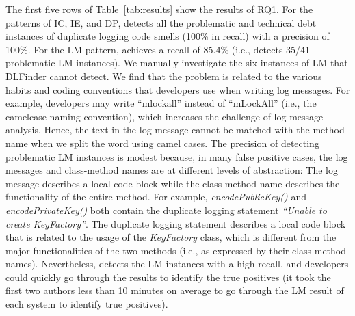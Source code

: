 The first five rows of Table~\ref{tab:results} show the results of RQ1. For the patterns of IC, IE, and DP, \toolS detects all the problematic and technical debt instances of duplicate logging code smells (100\% in recall) with a precision of 100\%. 
For the LM pattern, \toolS achieves a recall of 85.4\% (i.e., \toolS detects 35/41 problematic LM instances). We manually investigate the six instances of LM that DLFinder cannot detect. We find that the problem is related to the various habits and coding conventions that developers use when writing log messages. For example, developers may write ``mlockall'' instead of ``mLockAll'' (i.e., the camelcase naming convention), which increases the challenge of log message analysis. Hence, the text in the log message cannot be matched with the method name when we split the word using camel cases. The precision of detecting problematic LM instances is modest because, in many false positive cases, the log messages and class-method names are at different levels of abstraction: The log message describes a local code block while the class-method name describes the functionality of the entire method.
For example, {\em encodePublicKey()} and {\em encodePrivateKey()} both contain the duplicate logging statement {\em ``Unable to create KeyFactory''}. The duplicate logging statement describes a local code block that is related to the usage of the {\em KeyFactory} class, which is different from the major functionalities of the two methods (i.e., as expressed by their class-method names).
Nevertheless, \toolS detects the LM instances with a high recall, and developers could quickly go through the results to identify the true positives (it took the first two authors less than 10 minutes on average to go through the LM result of each system to identify true positives).

